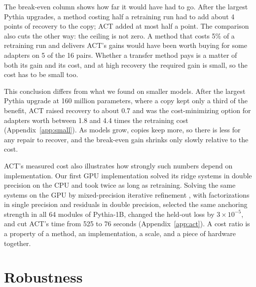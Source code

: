 \documentclass[ijds,blindrev]{informs4}
\begin{document}
The break-even column shows how far it would have had to go. After the largest Pythia upgrades, a method costing half a retraining run had to add about 4 points of recovery to the copy; ACT added at most half a point. The comparison also cuts the other way: the ceiling is not zero. A method that costs 5\% of a retraining run and delivers ACT's gains would have been worth buying for some adapters on 5 of the 16 pairs. Whether a transfer method pays is a matter of both its gain and its cost, and at high recovery the required gain is small, so the cost has to be small too.

This conclusion differs from what we found on smaller models. After the largest Pythia upgrade at 160 million parameters, where a copy kept only a third of the benefit, ACT raised recovery to about 0.7 and was the cost-minimizing option for adapters worth between 1.8 and 4.4 times the retraining cost (Appendix~\ref{app:small}). As models grow, copies keep more, so there is less for any repair to recover, and the break-even gain shrinks only slowly relative to the cost.

ACT's measured cost also illustrates how strongly such numbers depend on implementation. Our first GPU implementation solved its ridge systems in double precision on the CPU and took twice as long as retraining. Solving the same systems on the GPU by mixed-precision iterative refinement \citep{higham2002accuracy}, with factorizations in single precision and residuals in double precision, selected the same anchoring strength in all 64 modules of Pythia-1B, changed the held-out loss by $3\times10^{-5}$, and cut ACT's time from 525 to 76 seconds (Appendix~\ref{app:act}). A cost ratio is a property of a method, an implementation, a scale, and a piece of hardware together.

\section{Robustness}\label{sec:robust}
\end{document}
